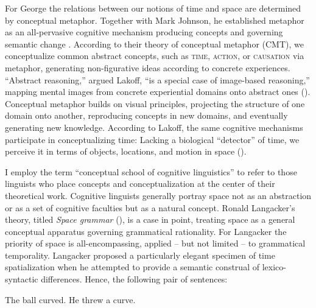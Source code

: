 \documentclass[english,output=paper,colorlinks,citecolor=brown]{../langscibook}
\begin{document}
For George \citet{Lakoff1993} the relations between our notions of time and space are determined by conceptual metaphor. Together with Mark Johnson, he established metaphor as an all-pervasive cognitive mechanism producing concepts and governing semantic change \citep{LakoffJohnson1980}. According to their theory of conceptual metaphor (CMT), we conceptualize common abstract concepts, such as \textsc{time}, \textsc{action}, or \textsc{causation} via metaphor, generating non-figurative ideas according to concrete experiences. “Abstract reasoning,” argued Lakoff, “is a special case of image-based reasoning,” mapping mental images from concrete experiential domains onto abstract ones (\citealt[229]{Lakoff1993}). Conceptual metaphor builds on visual principles, projecting the structure of one domain onto another, reproducing concepts in new domains, and eventually generating new knowledge. According to Lakoff, the same cognitive mechanisms participate in conceptualizing time: Lacking a biological “detector” of time, we perceive it in terms of objects, locations, and motion in space (\citealt[218]{Lakoff1993}).

I employ the term “conceptual school of cognitive linguistics” to refer to those linguists who place concepts and conceptualization at the center of their theoretical work. Cognitive linguists generally portray space not as an abstraction or as a set of cognitive faculties but as a natural concept. Ronald Langacker’s theory, titled \textit{Space grammar} (\citeyear{Langacker1982, Langacker1987}), is a case in point, treating space as a general conceptual apparatus governing grammatical rationality. For Langacker the priority of space is all-encompassing, applied -- but not limited -- to grammatical temporality. Langacker proposed a particularly elegant specimen of time spatialization when he attempted to provide a semantic construal of lexico-syntactic differences. Hence, the following pair of sentences: 

\ea \label{ex:3:1} The ball curved.
\ex \label{ex:3:2} He threw a curve.
\z
         
\end{document}
